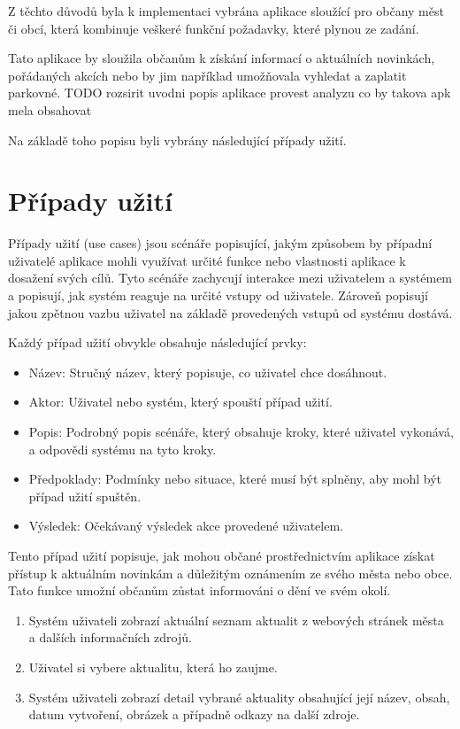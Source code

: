 Z těchto důvodů byla k implementaci vybrána aplikace sloužící pro občany měst či obcí, která kombinuje veškeré funkční požadavky, které plynou ze zadání.

Tato aplikace by sloužila občanům k získání informací o aktuálních novinkách, pořádaných akcích nebo by jim například umožňovala vyhledat a zaplatit parkovné.
TODO rozsirit uvodni popis aplikace provest analyzu co by takova apk mela obsahovat

Na základě toho popisu byli vybrány následující případy užití.

\section{Případy užití}
Případy užití (use cases) jsou scénáře popisující, jakým způsobem by případní uživatelé aplikace mohli využívat určité funkce nebo
vlastnosti aplikace k dosažení svých cílů. \cite{} Tyto scénáře zachycují interakce mezi uživatelem a systémem a popisují, jak systém reaguje na určité vstupy od 
uživatele. Zároveň popisují jakou zpětnou vazbu uživatel na základě provedených vstupů od systému dostává.

Každý případ užití obvykle obsahuje následující prvky:

\begin{itemize}
  \item Název: Stručný název, který popisuje, co uživatel chce dosáhnout.
  \item Aktor: Uživatel nebo systém, který spouští případ užití.
  \item Popis: Podrobný popis scénáře, který obsahuje kroky, které uživatel vykonává, a odpovědi systému na tyto kroky.
  \item Předpoklady: Podmínky nebo situace, které musí být splněny, aby mohl být případ užití spuštěn.
  \item Výsledek: Očekávaný výsledek akce provedené uživatelem.
\end{itemize}

\medskip

Tento případ užití popisuje, jak mohou občané prostřednictvím aplikace získat přístup k aktuálním novinkám a důležitým oznámením ze svého města 
nebo obce. Tato funkce umožní občanům zůstat informováni o dění ve svém okolí.

\begin{enumerate}
  \item Systém uživateli zobrazí aktuální seznam aktualit z webových stránek města a dalších informačních zdrojů.
  \item Uživatel si vybere aktualitu, která ho zaujme.
  \item Systém uživateli zobrazí detail vybrané aktuality obsahující její název, obsah, datum vytvoření, obrázek a případně odkazy na další zdroje.
\end{enumerate}

